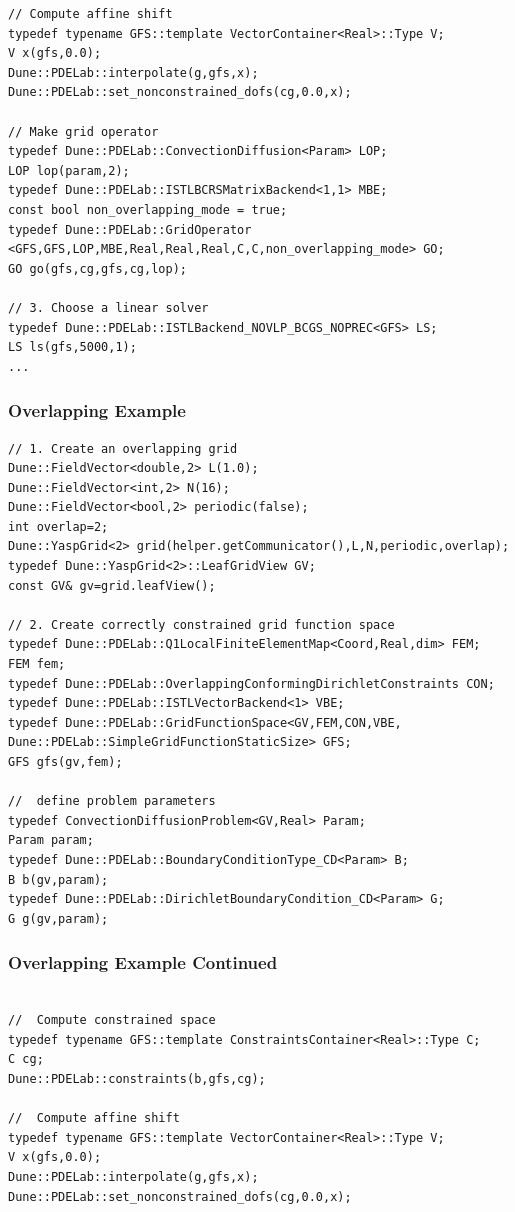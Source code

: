 {\begin{frame}[fragile]
\begin{lstlisting}[basicstyle=\tiny]
// Compute affine shift
typedef typename GFS::template VectorContainer<Real>::Type V;
V x(gfs,0.0);
Dune::PDELab::interpolate(g,gfs,x);
Dune::PDELab::set_nonconstrained_dofs(cg,0.0,x);

// Make grid operator
typedef Dune::PDELab::ConvectionDiffusion<Param> LOP; 
LOP lop(param,2);
typedef Dune::PDELab::ISTLBCRSMatrixBackend<1,1> MBE;
const bool non_overlapping_mode = true;
typedef Dune::PDELab::GridOperator
<GFS,GFS,LOP,MBE,Real,Real,Real,C,C,non_overlapping_mode> GO;
GO go(gfs,cg,gfs,cg,lop);

// 3. Choose a linear solver 
typedef Dune::PDELab::ISTLBackend_NOVLP_BCGS_NOPREC<GFS> LS;
LS ls(gfs,5000,1);
...
\end{lstlisting}
  
\end{frame}

\begin{frame}[fragile]
  \frametitle{Overlapping Example}
  \begin{lstlisting}[basicstyle=\tiny]
// 1. Create an overlapping grid
Dune::FieldVector<double,2> L(1.0);
Dune::FieldVector<int,2> N(16);
Dune::FieldVector<bool,2> periodic(false);
int overlap=2; 
Dune::YaspGrid<2> grid(helper.getCommunicator(),L,N,periodic,overlap);
typedef Dune::YaspGrid<2>::LeafGridView GV;
const GV& gv=grid.leafView();

// 2. Create correctly constrained grid function space
typedef Dune::PDELab::Q1LocalFiniteElementMap<Coord,Real,dim> FEM;
FEM fem;
typedef Dune::PDELab::OverlappingConformingDirichletConstraints CON;
typedef Dune::PDELab::ISTLVectorBackend<1> VBE;
typedef Dune::PDELab::GridFunctionSpace<GV,FEM,CON,VBE,
Dune::PDELab::SimpleGridFunctionStaticSize> GFS;
GFS gfs(gv,fem);

//  define problem parameters
typedef ConvectionDiffusionProblem<GV,Real> Param;
Param param;
typedef Dune::PDELab::BoundaryConditionType_CD<Param> B;
B b(gv,param);
typedef Dune::PDELab::DirichletBoundaryCondition_CD<Param> G;
G g(gv,param);
\end{lstlisting}  
\end{frame}
\begin{frame}[fragile]
\frametitle<presentation>{Overlapping Example Continued}
  \begin{lstlisting}[basicstyle=\tiny]

//  Compute constrained space
typedef typename GFS::template ConstraintsContainer<Real>::Type C;
C cg;
Dune::PDELab::constraints(b,gfs,cg);

//  Compute affine shift
typedef typename GFS::template VectorContainer<Real>::Type V;
V x(gfs,0.0);
Dune::PDELab::interpolate(g,gfs,x);
Dune::PDELab::set_nonconstrained_dofs(cg,0.0,x);


\end{lstlisting}
\end{frame}}
